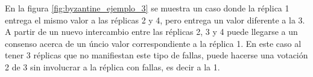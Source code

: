 

En la figura \ref{fig:byzantine_ejemplo_3} se muestra un caso donde la réplica 1 entrega el mismo valor a las réplicas 2 y 4, pero entrega un valor diferente a la 3. A partir de un nuevo intercambio entre las réplicas 2, 3 y 4 puede llegarse a un consenso acerca de un úncio valor correspondiente a la réplica 1. En este caso al tener 3 réplicas que no manifiestan este tipo de fallas, puede hacerse una votación 2 de 3 sin involucrar a la réplica con fallas, es decir a la 1.


